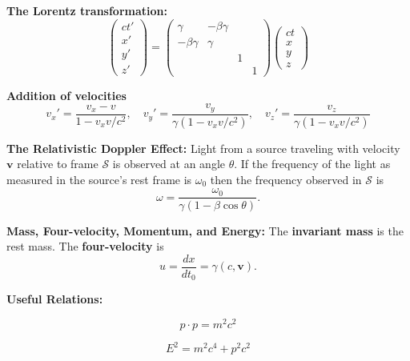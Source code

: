 \documentclass{book}
\theoremstyle{definition}
\newcommand{\be}{\beta}
\newcommand{\x}{\xi}
\newcommand{\f}[2]{\frac{#1}{#2}}
\begin{document}
\noindent \textbf{The Lorentz transformation:}
\begin{equation*}
\begin{pmatrix}
ct' \\ x' \\ y' \\ z'
\end{pmatrix}
= 
\begin{pmatrix}
\gamma & -\be\gamma &&\\
-\be \gamma & \gamma &&\\
&&1&\\
&&&1
\end{pmatrix}
\begin{pmatrix}
ct\\x\\y\\z
\end{pmatrix}
\end{equation*}



\noindent \textbf{Addition of velocities}
\begin{equation*}
v_x' = \f{v_x - v}{1 - v_x v/c^2},\quad v_y' = \f{v_y}{\gamma(1 - v_xv/c^2)}, \quad v_z' = \f{v_z}{\gamma(1 - v_x v/c^2)}
\end{equation*}


\noindent \textbf{The Relativistic Doppler Effect:}
Light from a source traveling with velocity $\textbf{v}$ relative to frame $\mathcal{S}$ is observed at an angle $\theta$. If the frequency of the light as measured in the source's rest frame is $\omega_0$ then the frequency observed in $\mathcal{S}$ is 
\begin{equation*}
\omega = \f{\omega_0}{\gamma(1- \beta\cos\theta)}.
\end{equation*}




\noindent \textbf{Mass, Four-velocity, Momentum, and Energy:}
The \textbf{invariant mass} is the rest mass. The \textbf{four-velocity} is 
\begin{equation*}
u = \f{dx}{dt_0} = \gamma(c,\textbf{v}).
\end{equation*}


\noindent \textbf{Useful Relations:}

\begin{equation*}
p\cdot p = m^2c^2
\end{equation*}

\begin{equation*}
E^2 = m^2 c^4 + p^2 c^2
\end{equation*}
\end{document}

